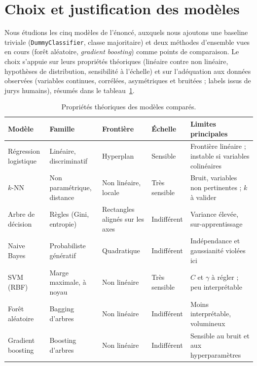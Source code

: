 \documentclass[11pt,a4paper]{article}
\begin{document}
\section{Choix et justification des modèles}\label{sec:modeles}

Nous étudions les cinq modèles de l'énoncé, auxquels nous ajoutons une baseline triviale (\texttt{DummyClassifier}, classe majoritaire) et deux méthodes d'ensemble vues en cours
(forêt aléatoire, \emph{gradient boosting}) comme points de comparaison. Le choix s'appuie sur leurs propriétés théoriques (linéaire contre non linéaire, hypothèses de distribution,
sensibilité à l'échelle) et sur l'adéquation aux données observées (variables continues, corrélées, asymétriques et bruitées ; labels issus de jurys humains), résumés dans le tableau~\ref{tab:modeles}.

\begin{table}[htbp]
\centering\scriptsize
\caption{Propriétés théoriques des modèles comparés.}\label{tab:modeles}
\begin{tabular}{@{}p{2.1cm}p{3.1cm}p{2.7cm}p{2.3cm}p{4.3cm}@{}}
\toprule
Modèle & Famille & Frontière & Échelle & Limites principales \\
\midrule
Régression logistique & Linéaire, discriminatif & Hyperplan & Sensible & Frontière linéaire ; instable si variables colinéaires \\
$k$-NN & Non paramétrique, distance & Non linéaire, locale & Très sensible & Bruit, variables non pertinentes ; $k$ à valider \\
Arbre de décision & Règles (Gini, entropie) & Rectangles alignés sur les axes & Indifférent & Variance élevée, sur-apprentissage \\
Naive Bayes & Probabiliste génératif & Quadratique & Indifférent & Indépendance et gaussianité violées ici \\
SVM (RBF) & Marge maximale, à noyau & Non linéaire & Très sensible & $C$ et $\gamma$ à régler ; peu interprétable \\
Forêt aléatoire & Bagging d'arbres & Non linéaire & Indifférent & Moins interprétable, volumineux \\
Gradient boosting & Boosting d'arbres & Non linéaire & Indifférent & Sensible au bruit et aux hyperparamètres \\
\bottomrule
\end{tabular}
\end{table}
\end{document}
